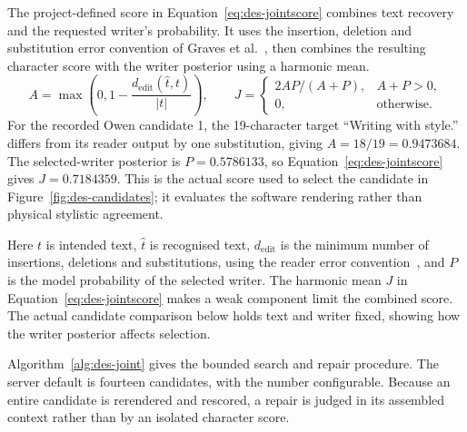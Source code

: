 The project-defined score in Equation~\ref{eq:des-jointscore} combines text recovery and the requested writer's probability. It uses the insertion, deletion and substitution error convention of Graves et al.~\cite[p.~2]{graves2006}, then combines the resulting character score with the writer posterior using a harmonic mean.
\begin{equation}
A=\max\left(0,1-\frac{d_{\mathrm{edit}}(\widehat t,t)}{|t|}\right),\qquad
J=\begin{cases}2AP/(A+P),&A+P>0,\\0,&\text{otherwise}.\end{cases}
\label{eq:des-jointscore}
\end{equation}
For the recorded Owen candidate 1, the 19-character target ``Writing with style.'' differs from its reader output by one substitution, giving $A=18/19=0.9473684$. The selected-writer posterior is $P=0.5786133$, so Equation~\ref{eq:des-jointscore} gives $J=0.7184359$. This is the actual score used to select the candidate in Figure~\ref{fig:des-candidates}; it evaluates the software rendering rather than physical stylistic agreement.

Here $t$ is intended text, $\widehat t$ is recognised text, $d_{\mathrm{edit}}$ is the minimum number of insertions, deletions and substitutions, using the reader error convention~\cite[p.~2]{graves2006}, and $P$ is the model probability of the selected writer. The harmonic mean $J$ in Equation~\ref{eq:des-jointscore} makes a weak component limit the combined score. The actual candidate comparison below holds text and writer fixed, showing how the writer posterior affects selection.

Algorithm~\ref{alg:des-joint} gives the bounded search and repair procedure. The server default is fourteen candidates, with the number configurable. Because an entire candidate is rerendered and rescored, a repair is judged in its assembled context rather than by an isolated character score.

